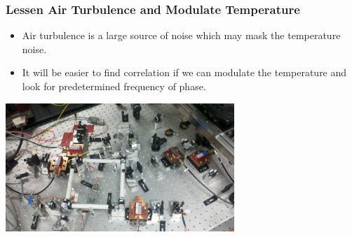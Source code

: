 \documentclass[notes, compressed, blue]{beamer}
\begin{document}
\begin{frame}
\frametitle{Lessen Air Turbulence and Modulate Temperature}

\begin{itemize}
\item{Air turbulence is a large source of noise which may mask the temperature noise.}
\item{It will be easier to find correlation if we can modulate the temperature and look for predetermined frequency of phase.}
\end{itemize}
\begin{center}\includegraphics[width=3.4in]{improvements.jpg}\end{center}

\end{frame}
\end{document}
